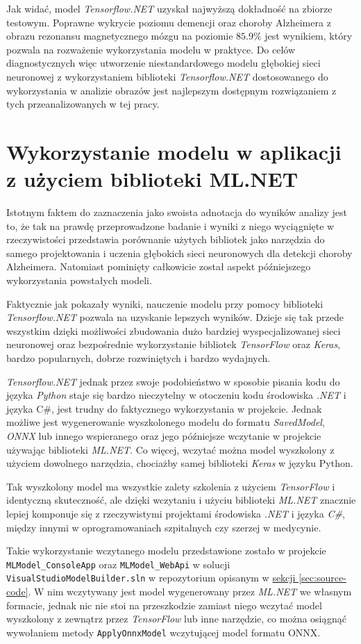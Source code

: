 Jak widać, model \emph{Tensorflow.NET} uzyskał najwyższą dokładność na zbiorze testowym.
Poprawne wykrycie poziomu demencji oraz choroby Alzheimera z obrazu rezonansu magnetycznego mózgu na poziomie $85.9\%$ jest wynikiem, który pozwala na rozważenie wykorzystania modelu w praktyce.
Do celów diagnostycznych więc utworzenie niestandardowego modelu głębokiej sieci neuronowej z wykorzystaniem biblioteki \emph{Tensorflow.NET} dostosowanego do wykorzystania w analizie obrazów jest najlepszym dostępnym rozwiązaniem z tych przeanalizowanych w tej pracy.

\section{Wykorzystanie modelu w aplikacji z użyciem biblioteki ML.NET}

Istotnym faktem do zaznaczenia jako swoista adnotacja do wyników analizy jest to, że tak na prawdę przeprowadzone badanie i wyniki z niego wyciągnięte w rzeczywistości przedstawia porównanie użytych bibliotek jako narzędzia do samego projektowania i uczenia głębokich sieci neuronowych dla detekcji choroby Alzheimera.
Natomiast pominięty całkowicie został aspekt późniejszego wykorzystania powstałych modeli.

Faktycznie jak pokazały wyniki, nauczenie modelu przy pomocy biblioteki \emph{Tensorflow.NET} pozwala na uzyskanie lepszych wyników.
Dzieje się tak przede wszystkim dzięki możliwości zbudowania dużo bardziej wyspecjalizowanej sieci neuronowej oraz bezpośrednie wykorzystanie bibliotek \emph{TensorFlow} oraz \emph{Keras}, bardzo popularnych, dobrze rozwiniętych i bardzo wydajnych.

\emph{Tensorflow.NET} jednak przez swoje podobieństwo w sposobie pisania kodu do języka \emph{Python} staje się bardzo nieczytelny w otoczeniu kodu środowiska \emph{.NET} i języka C\#, jest trudny do faktycznego wykorzystania w projekcie.
Jednak możliwe jest wygenerowanie wyszkolonego modelu do formatu \emph{SavedModel}, \emph{ONNX} lub innego wspieranego oraz jego późniejsze wczytanie w projekcie używając biblioteki \emph{ML.NET}.
Co więcej, wczytać można model wyszkolony z użyciem dowolnego narzędzia, chociażby samej biblioteki \emph{Keras} w języku Python.

Tak wyszkolony model ma wszystkie zalety szkolenia z użyciem \emph{TensorFlow} i identyczną skuteczność, ale dzięki wczytaniu i użyciu biblioteki \emph{ML.NET} znacznie lepiej komponuje się z rzeczywistymi projektami środowiska \emph{.NET} i języka \emph{C\#}, między innymi w oprogramowaniach szpitalnych czy szerzej w medycynie.

Takie wykorzystanie wczytanego modelu przedstawione zostało w projekcie \lstinline{MLModel_ConsoleApp} oraz \lstinline{MLModel_WebApi} w solucji \lstinline{VisualStudioModelBuilder.sln} w repozytorium opisanym w \hyperref[sec:source-code]{sekcji \ref*{sec:source-code}}.
W nim wczytywany jest model wygenerowany przez \emph{ML.NET} we własnym formacie, jednak nic nie stoi na przeszkodzie zamiast niego wczytać model wyszkolony z zewnątrz przez \emph{TensorFlow} lub inne narzędzie, co można osiągnąć wywołaniem metody \lstinline{ApplyOnnxModel} wczytującej model formatu ONNX.
